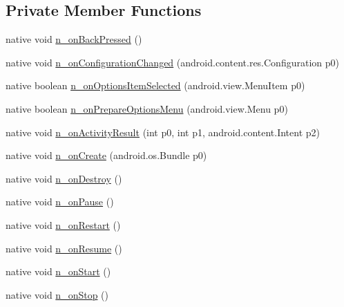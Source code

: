 \subsection*{Private Member Functions}
\begin{CompactItemize}
\item 
native void \hyperlink{classmd5b60ffeb829f638581ab2bb9b1a7f4f3f_1_1_forms_application_activity_ac3983f4085466646a1bef286ee44d22}{n\_\-onBackPressed} ()
\item 
native void \hyperlink{classmd5b60ffeb829f638581ab2bb9b1a7f4f3f_1_1_forms_application_activity_88e1391180bf7d09a68cf9dd7c010206}{n\_\-onConfigurationChanged} (android.content.res.Configuration p0)
\item 
native boolean \hyperlink{classmd5b60ffeb829f638581ab2bb9b1a7f4f3f_1_1_forms_application_activity_ead7f610c620e57a4d2d88d671a4c54d}{n\_\-onOptionsItemSelected} (android.view.MenuItem p0)
\item 
native boolean \hyperlink{classmd5b60ffeb829f638581ab2bb9b1a7f4f3f_1_1_forms_application_activity_a32145b7d59e5cd58a5d92e9f3b27d4e}{n\_\-onPrepareOptionsMenu} (android.view.Menu p0)
\item 
native void \hyperlink{classmd5b60ffeb829f638581ab2bb9b1a7f4f3f_1_1_forms_application_activity_a1c5897431d89f265b491c980b75174c}{n\_\-onActivityResult} (int p0, int p1, android.content.Intent p2)
\item 
native void \hyperlink{classmd5b60ffeb829f638581ab2bb9b1a7f4f3f_1_1_forms_application_activity_b22f0c6a22f2ddb60c0a6708e3cbb935}{n\_\-onCreate} (android.os.Bundle p0)
\item 
native void \hyperlink{classmd5b60ffeb829f638581ab2bb9b1a7f4f3f_1_1_forms_application_activity_ec7d245791c8b4e3e29a25bad16ae30c}{n\_\-onDestroy} ()
\item 
native void \hyperlink{classmd5b60ffeb829f638581ab2bb9b1a7f4f3f_1_1_forms_application_activity_12c4f8c99c26c1d6a8cc3aa34f1177c4}{n\_\-onPause} ()
\item 
native void \hyperlink{classmd5b60ffeb829f638581ab2bb9b1a7f4f3f_1_1_forms_application_activity_8dc46393dd25e36f9e60b48e517a7be6}{n\_\-onRestart} ()
\item 
native void \hyperlink{classmd5b60ffeb829f638581ab2bb9b1a7f4f3f_1_1_forms_application_activity_616e19bf6bd736d270dc02725a585e0b}{n\_\-onResume} ()
\item 
native void \hyperlink{classmd5b60ffeb829f638581ab2bb9b1a7f4f3f_1_1_forms_application_activity_d2c36cce297252bda55d7648240fd55e}{n\_\-onStart} ()
\item 
native void \hyperlink{classmd5b60ffeb829f638581ab2bb9b1a7f4f3f_1_1_forms_application_activity_93070ba7341ef9ca5a32f257d91d5a48}{n\_\-onStop} ()
\end{CompactItemize}
